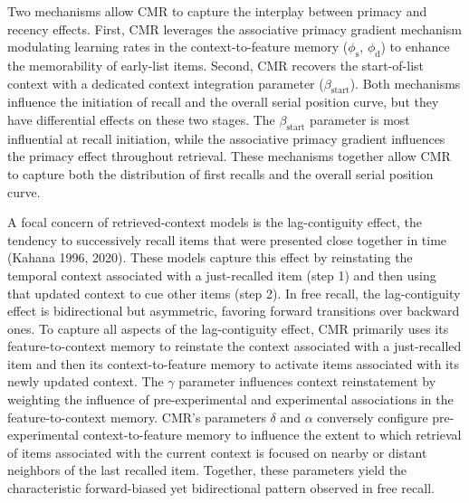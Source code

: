 \documentclass[
  letterpaper,
  DIV=11,
  numbers=noendperiod]{scrartcl}
\begin{document}
Two mechanisms allow CMR to capture the interplay between primacy and
recency effects. First, CMR leverages the associative primacy gradient
mechanism modulating learning rates in the context-to-feature memory
(\(\phi_\text{s}\), \(\phi_\text{d}\)) to enhance the memorability of
early-list items. Second, CMR recovers the start-of-list context with a
dedicated context integration parameter (\(\beta_\text{start}\)). Both
mechanisms influence the initiation of recall and the overall serial
position curve, but they have differential effects on these two stages.
The \(\beta_\text{start}\) parameter is most influential at recall
initiation, while the associative primacy gradient influences the
primacy effect throughout retrieval. These mechanisms together allow CMR
to capture both the distribution of first recalls and the overall serial
position curve.

A focal concern of retrieved-context models is the lag-contiguity
effect, the tendency to successively recall items that were presented
close together in time (Kahana 1996, 2020). These models capture this
effect by reinstating the temporal context associated with a
just-recalled item (step 1) and then using that updated context to cue
other items (step 2). In free recall, the lag-contiguity effect is
bidirectional but asymmetric, favoring forward transitions over backward
ones. To capture all aspects of the lag-contiguity effect, CMR primarily
uses its feature-to-context memory to reinstate the context associated
with a just-recalled item and then its context-to-feature memory to
activate items associated with its newly updated context. The \(\gamma\)
parameter influences context reinstatement by weighting the influence of
pre-experimental and experimental associations in the feature-to-context
memory. CMR's parameters \(\delta\) and \(\alpha\) conversely configure
pre-experimental context-to-feature memory to influence the extent to
which retrieval of items associated with the current context is focused
on nearby or distant neighbors of the last recalled item. Together,
these parameters yield the characteristic forward-biased yet
bidirectional pattern observed in free recall.
\end{document}
